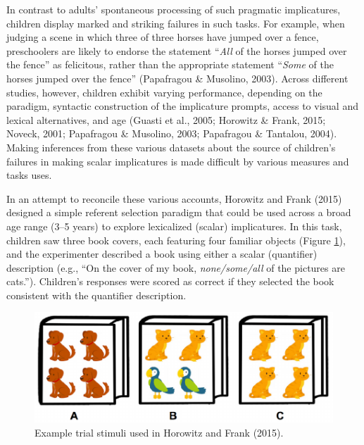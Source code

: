 \documentclass[10pt, letterpaper]{article}
\newenvironment{CodeChunk}{}{}
\begin{document}
In contrast to adults' spontaneous processing of such pragmatic
implicatures, children display marked and striking failures in such
tasks. For example, when judging a scene in which three of three horses
have jumped over a fence, preschoolers are likely to endorse the
statement ``\emph{All} of the horses jumped over the fence'' as
felicitous, rather than the appropriate statement ``\emph{Some} of the
horses jumped over the fence'' (Papafragou \& Musolino, 2003). Across
different studies, however, children exhibit varying performance,
depending on the paradigm, syntactic construction of the implicature
prompts, access to visual and lexical alternatives, and age (Guasti et
al., 2005; Horowitz \& Frank, 2015; Noveck, 2001; Papafragou \&
Musolino, 2003; Papafragou \& Tantalou, 2004). Making inferences from
these various datasets about the source of children's failures in making
scalar implicatures is made difficult by various measures and tasks
uses.

In an attempt to reconcile these various accounts, Horowitz and Frank
(2015) designed a simple referent selection paradigm that could be used
across a broad age range (3--5 years) to explore lexicalized (scalar)
implicatures. In this task, children saw three book covers, each
featuring four familiar objects (Figure \ref{fig:image}), and the
experimenter described a book using either a scalar (quantifier)
description (e.g., ``On the cover of my book, \emph{none/some/all} of
the pictures are cats.''). Children's responses were scored as correct
if they selected the book consistent with the quantifier description.

\begin{CodeChunk}
\begin{figure}[H]

{\centering \includegraphics{figs/image-1} 

}

\caption[Example trial stimuli used in Horowitz and Frank (2015)]{Example trial stimuli used in Horowitz and Frank (2015).}\label{fig:image}
\end{figure}
\end{CodeChunk}
\end{document}
